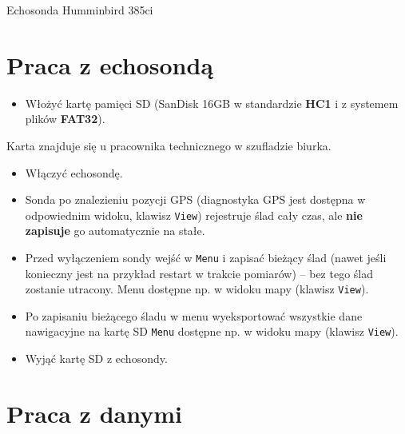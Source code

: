 \documentclass[
  letterpaper,
  DIV=11,
  numbers=noendperiod]{scrreprt}
\providecommand{\tightlist}{%
  \setlength{\itemsep}{0pt}\setlength{\parskip}{0pt}}\usepackage{longtable,booktabs,array}
\begin{document}
Echosonda Humminbird 385ci

\hypertarget{praca-z-echosondux105}{%
\section{Praca z echosondą}\label{praca-z-echosondux105}}

\begin{itemize}
\tightlist
\item
  Włożyć kartę pamięci SD (SanDisk 16GB w standardzie \textbf{HC1} i z
  systemem plików \textbf{FAT32}).
\end{itemize}

\begin{tcolorbox}[enhanced jigsaw, toptitle=1mm, bottomtitle=1mm, opacitybacktitle=0.6, colframe=quarto-callout-note-color-frame, bottomrule=.15mm, title=\textcolor{quarto-callout-note-color}{\faInfo}\hspace{0.5em}{Karta SD}, colbacktitle=quarto-callout-note-color!10!white, left=2mm, breakable, rightrule=.15mm, colback=white, opacityback=0, arc=.35mm, coltitle=black, leftrule=.75mm, toprule=.15mm, titlerule=0mm]

Karta znajduje się u pracownika technicznego w szufladzie biurka.

\end{tcolorbox}

\begin{itemize}
\tightlist
\item
  Włączyć echosondę.
\item
  Sonda po znalezieniu pozycji GPS (diagnostyka GPS jest dostępna w
  odpowiednim widoku, klawisz \texttt{View}) rejestruje ślad cały czas,
  ale \textbf{nie zapisuje} go automatycznie na stałe.
\item
  Przed wyłączeniem sondy wejść w \texttt{Menu} i zapisać bieżący ślad
  (nawet jeśli konieczny jest na przykład restart w trakcie pomiarów) --
  bez tego ślad zostanie utracony. Menu dostępne np. w widoku mapy
  (klawisz \texttt{View}).
\item
  Po zapisaniu bieżącego śladu w menu wyeksportować wszystkie dane
  nawigacyjne na kartę SD \texttt{Menu} dostępne np. w widoku mapy
  (klawisz \texttt{View}).
\item
  Wyjąć kartę SD z echosondy.
\end{itemize}

\hypertarget{praca-z-danymi}{%
\section{Praca z danymi}\label{praca-z-danymi}}
\end{document}
